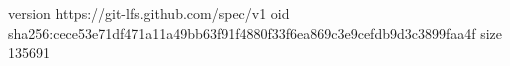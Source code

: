 version https://git-lfs.github.com/spec/v1
oid sha256:cece53e71df471a11a49bb63f91f4880f33f6ea869c3e9cefdb9d3c3899faa4f
size 135691
